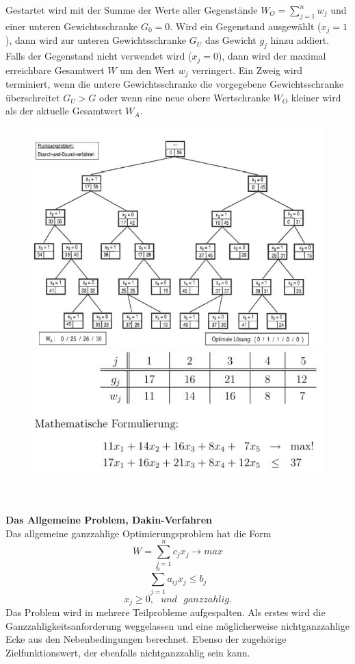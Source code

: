 		Gestartet wird mit der Summe der Werte aller Gegenstände $ W_{O} = \sum_{j=1}^{n} w_{j} $ und einer unteren Gewichtsschranke $ G_{0} = 0 $. Wird ein Gegenstand ausgewählt ($ x_{j} = 1 $), dann wird zur unteren Gewichtsschranke $ G_{U} $ das Gewicht $ g_{j} $ hinzu addiert. Falls der Gegenstand nicht verwendet wird ($ x_{j} = 0 $), dann wird der maximal erreichbare Gesamtwert $ W $ um den Wert $ w_{j} $ verringert. Ein Zweig wird terminiert, wenn die untere Gewichtsschranke die vorgegebene Gewichtsschranke überschreitet $ G_{U} > G $ oder wenn eine neue obere Wertschranke $ W_{O} $ kleiner wird als der aktuelle Gesamtwert $ W_{A} $.
		\begin{figure}[h]
			\centering
			\includegraphics[width=0.6\linewidth]{./pics/ma/rucksack}
			\includegraphics[width=0.39\linewidth]{./pics/ma/rucksackt}
		\end{figure}
		\leavevmode \\\\
		\textbf{Das Allgemeine Problem, Dakin-Verfahren}\\
		Das allgemeine ganzzahlige Optimierungsproblem hat die Form
		\[W = \sum_{j=1}^{n}c_{j}x_{j} \rightarrow max\]
		\[\sum_{j=1}^{n} a_{ij}x_{j} \leq b_{j}\]
		\[x_{j} \geq 0,\text{ } und\text{ } ganzzahlig.\]
		Das Problem wird in mehrere Teilprobleme aufgespalten. Als erstes wird die Ganzzahligkeitsanforderung weggelassen und eine möglicherweise nichtganzzahlige Ecke aus den Nebenbedingungen berechnet. Ebenso der zugehörige Zielfunktionswert, der ebenfalls nichtganzzahlig sein kann.\\
